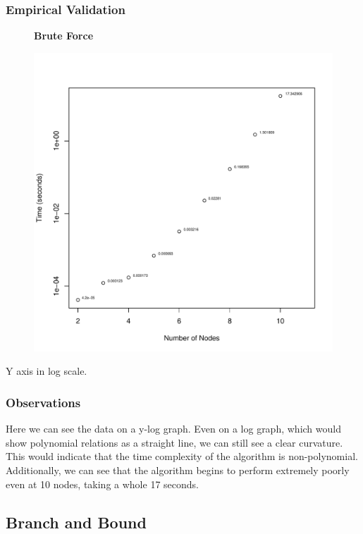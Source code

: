 \documentclass[a4paper,12pt]{article}
\begin{document}
\subsubsection{Empirical Validation}
\begin{figure}[H]
  \centering
  \textbf{Brute Force}\par\medskip
  \includegraphics[width=1\linewidth]{BruteForce.pdf}
\end{figure}
Y axis in log scale.
\subsubsection{Observations}
Here we can see the data on a y-log graph. Even on a log graph, which would show polynomial relations as a straight line, we can still see a clear curvature. This would indicate that the time complexity of the algorithm is non-polynomial. Additionally, we can see that the algorithm begins to perform extremely poorly even at 10 nodes, taking a whole 17 seconds. 
\subsection{Branch and Bound}
\end{document}
